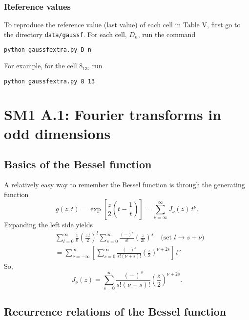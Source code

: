 \documentclass[preprint]{revtex4-1}
\numberwithin{equation}{subsection}
\numberwithin{table}{section}
\begin{document}
\subsubsection{Reference values}



To reproduce the reference value (last value) of
each cell in Table V,
first go to the directory
\texttt{data/gaussf}.
For each cell, $D_n$,
run the command

\qquad\texttt{python gaussfextra.py D n}

For example, for the cell $8_{13}$,
run

\qquad\texttt{python gaussfextra.py 8 13}



\section{SM1 A.1: Fourier transforms in odd dimensions}



\subsection{Basics of the Bessel function}



A relatively easy way to remember the Bessel function
is through the generating function
%
\begin{equation}
  g(z, t)
  =
  \exp\left[ \frac{z}{2} \left(t - \frac{1}{t}\right) \right]
  =
  \sum_{\nu = \infty}^\infty J_\nu(z) \, t^\nu.
  \label{eq:BesselGF}
\end{equation}
%
Expanding the left side yields
\begin{align*}
&
  \sum_{l = 0}^\infty \frac{ 1 } { l! } \left( \frac {z \, t} 2\right)^l
  \sum_{s = 0}^\infty \frac{ (-)^s } { s! }
    \left( \frac z {2t} \right)^s
  \quad \mbox{(set $l \rightarrow s + \nu$)} \\
&=
  \sum_{\nu = -\infty}^\infty
  \left[
  \sum_{s = 0}^\infty
  \frac { (-)^s } {s! (\nu + s)! }
  \left( \frac z 2 \right)^{\nu + 2s}
  \right]
  \, t^\nu
\end{align*}
So,
\begin{equation}
  J_\nu(z)
=
  \sum_{s = 0}^\infty
  \frac{ (-)^s } { s! (\nu + s)! }
  \left( \frac z 2 \right)^{\nu + 2s}.
  \label{eq:bessel}
\end{equation}



\subsection{Recurrence relations of the Bessel function}
\end{document}
